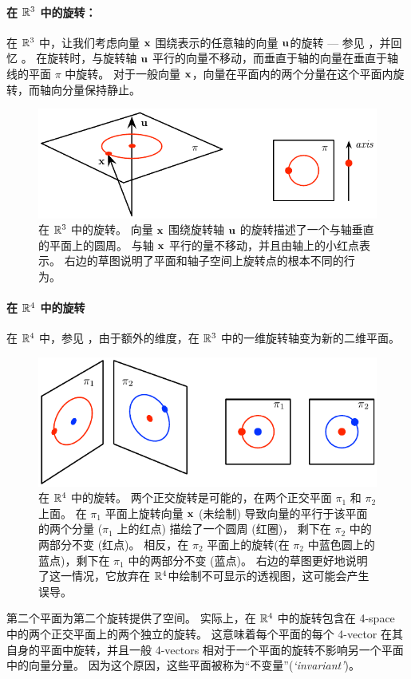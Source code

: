 \paragraph{在 ${\mathbb R}^3$ 中的旋转：} 
%
在 ${\mathbb R}^3$ 中，让我们考虑向量 ${\bf x}$ 围绕表示的任意轴的向量 ${\bf u}$的旋转 --- 参见 ，并回忆 。
在旋转时，与旋转轴 ${\bf u}$ 平行的向量不移动，而垂直于轴的向量在垂直于轴线的平面 $\pi$ 中旋转。 
对于一般向量 ${\bf x}$，向量在平面内的两个分量在这个平面内旋转，而轴向分量保持静止。
%
\begin{figure}[tb]
\begin{center}
\includegraphics{figures/isoclinic3}
\caption{%
在 ${\mathbb R}^3$ 中的旋转。 
向量 ${\bf x}$ 围绕旋转轴 ${\bf u}$ 的旋转描述了一个与轴垂直的平面上的圆周。 
与轴 ${\bf x}$ 平行的量不移动，并且由轴上的小红点表示。
右边的草图说明了平面和轴子空间上旋转点的根本不同的行为。 
}
\label{fig:isoclinic3}
\end{center}
\end{figure}


\paragraph{在 ${\mathbb R}^4$ 中的旋转} 
%
在 ${\mathbb R}^4$ 中，参见 ，由于额外的维度，在 ${\mathbb R}^3$ 中的一维旋转轴变为新的二维平面。
%
\begin{figure}[tb]
\begin{center}
\includegraphics{figures/isoclinic4}
\caption{%
在 ${\mathbb R}^4$ 中的旋转。 
两个正交旋转是可能的，在两个正交平面 $\pi_1$ 和 $\pi_2$ 上面。 
在 $\pi_1$ 平面上旋转向量 ${\bf x}$ (未绘制) 导致向量的平行于该平面的两个分量 ($\pi_1$ 上的红点) 描绘了一个圆周 (红圈)，
剩下在 $\pi_2$ 中的两部分不变 (红点)。
相反，在 $\pi_2$ 平面上的旋转(在 $\pi_2$ 中蓝色圆上的蓝点)，剩下在 $\pi_1$ 中的两部分不变 (蓝点)。
右边的草图更好地说明了这一情况，它放弃在 ${\mathbb R}^4$中绘制不可显示的透视图，这可能会产生误导。
}
\label{fig:isoclinic4}
\end{center}
\end{figure}
%
第二个平面为第二个旋转提供了空间。
实际上，在 ${\mathbb R}^4$ 中的旋转包含在 4-space 中的两个正交平面上的两个独立的旋转。 
这意味着每个平面的每个 4-vector 在其自身的平面中旋转，并且一般 4-vectors 相对于一个平面的旋转不影响另一个平面中的向量分量。 
因为这个原因，这些平面被称为“不变量”(\emph{`invariant'})。

